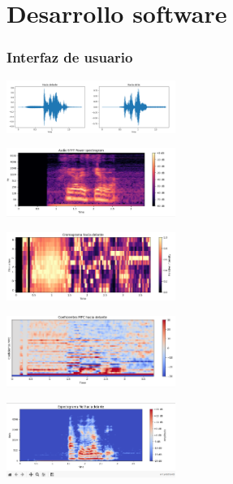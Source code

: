 \documentclass{beamer}
\begin{document}
\section{Desarrollo software}
\begin{frame}
\frametitle{Interfaz de usuario}
\centering
\begin{minipage}{0.45\textwidth}
    \centering
    \includegraphics[width=5.5cm]{figs/forma_onda.png}
\end{minipage}
\hfill
\begin{minipage}{0.45\textwidth}
    \centering
    \includegraphics[width=5.5cm]{figs/stft_spectogram.png}
\end{minipage}
\hfill
\vspace{0.3cm} %
\begin{minipage}{0.45\textwidth}
    \centering
    \includegraphics[width=5.5cm]{figs/cromagrama.png}
\end{minipage}
\hfill
\begin{minipage}{0.45\textwidth}
    \centering
    \includegraphics[width=5.5cm]{figs/coeficientes_mfc.png}
\end{minipage}
\hfill
\vspace{0.3cm} %
\begin{minipage}{0.45\textwidth}
    \centering
    \includegraphics[width=5.5cm]{figs/mel_spectrogram.png}
\end{minipage}


\end{frame}
\end{document}

